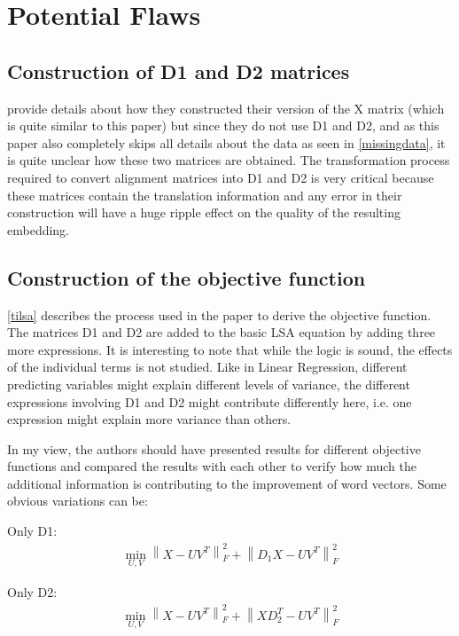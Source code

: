 \documentclass[11pt]{article}
\begin{document}
\section{Potential Flaws}
\subsection{Construction of D1 and D2 matrices}
\cite{faruqui2014improving} provide details about how they constructed their version of the X matrix (which is quite similar to this paper) but since they do not use D1 and D2, and as this paper also completely skips all details about the data as seen in \ref{missingdata}, it is quite unclear how these two matrices are obtained. The transformation process required to convert alignment matrices into D1 and D2 is very critical because these matrices contain the translation information and any error in their construction will have a huge ripple effect on the quality of the resulting embedding.

\subsection{Construction of the objective function}
\ref{tilsa} describes the process used in the paper to derive the objective function. The matrices D1 and D2 are added to the basic LSA equation by adding three more expressions. It is interesting to note that while the logic is sound, the effects of the individual terms is not studied. Like in Linear Regression, different predicting variables might explain different levels of variance, the different expressions involving D1 and D2 might contribute differently here, i.e. one expression might explain more variance than others.

In my view, the authors should have presented results for different objective functions and compared the results with each other to verify how much the additional information is contributing to the improvement of word vectors. Some obvious variations can be:

Only D1:
\begin{multline}
\min_{U,V}\left\lVert X - UV^T \right\rVert^{2}_F + \left\lVert D_{1}X - UV^T \right\rVert^{2}_F
\end{multline}

Only D2:
\begin{multline}
\min_{U,V}\left\lVert X - UV^T \right\rVert^{2}_F + \left\lVert XD^{T}_2 - UV^T \right\rVert^{2}_F
\end{multline}
\end{document}
